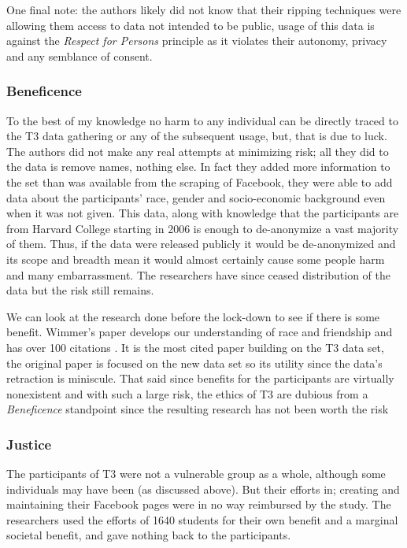 \documentclass[10pt,a4paper,twocolumn]{article}
\begin{document}
One final note: the authors likely did not know that their ripping techniques were allowing them access to data not intended to be public\cite{zimmerblog}, usage of this data is against the \textit{Respect for Persons} principle as it violates their autonomy, privacy and any semblance of consent.

\subsubsection*{Beneficence}

To the best of my knowledge no harm to any individual can be directly traced to the T3 data gathering or any of the subsequent usage, but, that is due to luck. The authors did not make any real attempts at minimizing risk; all they did to the data is remove names\cite{t3}, nothing else. In fact they added more information to the set than was available from the scraping of Facebook, they were able to add data about the participants' race, gender and socio-economic background even when it was not given\cite{t3}. This data, along with knowledge that the participants are from Harvard College starting in 2006 is enough to de-anonymize a vast majority of them\cite{bitbybit}. Thus, if the data were released publicly it would be de-anonymized and its scope and breadth mean it would almost certainly cause some people harm and many embarrassment. The researchers have since ceased distribution of the data but the risk still remains.\par

We can look at the research done before the lock-down to see if there is some benefit. Wimmer's paper \cite{t3followup1} develops our understanding of race and friendship and has over 100 citations \cite{wos}. It is the most cited paper building on the T3 data set, the original paper is focused on the new data set so its utility since the data's retraction is miniscule\cite{t3}\cite{zimethics}. That said since benefits for the participants are virtually nonexistent and with such a large risk, the ethics of T3 are dubious from a \textit{Beneficence} standpoint since the resulting research has not been worth the risk

\subsubsection*{Justice}

The participants of T3 were not a vulnerable group as a whole, although some individuals may have been (as discussed above). But their efforts in; creating and maintaining their Facebook pages were in no way reimbursed by the study. The researchers used the efforts of 1640 students for their own benefit and a marginal societal benefit, and gave nothing back to the participants.\par
\end{document}
